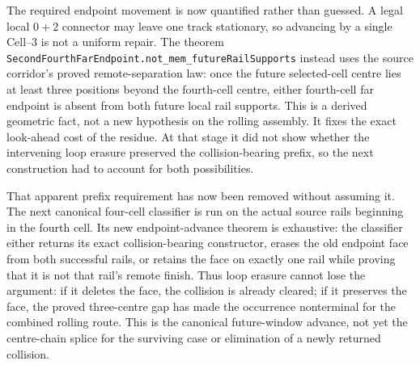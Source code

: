 \documentclass[11pt]{article}
\theoremstyle{definition}
\begin{document}
The required endpoint movement is now quantified rather than guessed.  A
legal local $0+2$ connector may leave one track stationary, so advancing by a
single Cell--3 is not a uniform repair.  The theorem
\texttt{SecondFourthFarEndpoint.not\_mem\_futureRailSupports} instead uses the
source corridor's proved remote-separation law: once the future selected-cell
centre lies at least three positions beyond the fourth-cell centre, either
fourth-cell far endpoint is absent from both future local rail supports.  This
is a derived geometric fact, not a new hypothesis on the rolling assembly.
It fixes the exact look-ahead cost of the residue.  At that stage it did not
show whether the intervening loop erasure preserved the collision-bearing
prefix, so the next construction had to account for both possibilities.

That apparent prefix requirement has now been removed without assuming it.
The next canonical four-cell classifier is run on the actual source rails
beginning in the fourth cell.  Its new endpoint-advance theorem is exhaustive:
the classifier either returns its exact collision-bearing constructor, erases
the old endpoint face from both successful rails, or retains the face on
exactly one rail while proving that it is not that rail's remote finish.  Thus
loop erasure cannot lose the argument: if it deletes the face, the collision
is already cleared; if it preserves the face, the proved three-centre gap has
made the occurrence nonterminal for the combined rolling route.  This is the
canonical future-window advance, not yet the centre-chain splice for the
surviving case or elimination of a newly returned collision.
\end{document}
